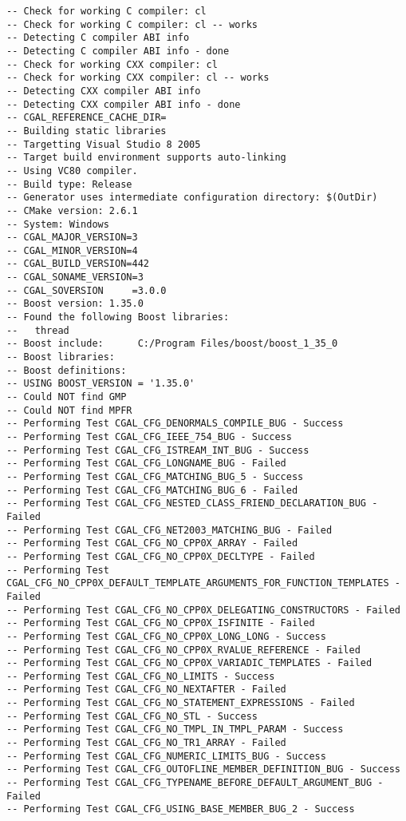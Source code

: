 {\ccTexHtml{\scriptsize}{}
\begin{verbatim}
-- Check for working C compiler: cl
-- Check for working C compiler: cl -- works
-- Detecting C compiler ABI info
-- Detecting C compiler ABI info - done
-- Check for working CXX compiler: cl
-- Check for working CXX compiler: cl -- works
-- Detecting CXX compiler ABI info
-- Detecting CXX compiler ABI info - done
-- CGAL_REFERENCE_CACHE_DIR=
-- Building static libraries
-- Targetting Visual Studio 8 2005
-- Target build environment supports auto-linking
-- Using VC80 compiler.
-- Build type: Release
-- Generator uses intermediate configuration directory: $(OutDir)
-- CMake version: 2.6.1
-- System: Windows
-- CGAL_MAJOR_VERSION=3
-- CGAL_MINOR_VERSION=4
-- CGAL_BUILD_VERSION=442
-- CGAL_SONAME_VERSION=3
-- CGAL_SOVERSION     =3.0.0
-- Boost version: 1.35.0
-- Found the following Boost libraries:
--   thread
-- Boost include:      C:/Program Files/boost/boost_1_35_0
-- Boost libraries:    
-- Boost definitions:  
-- USING BOOST_VERSION = '1.35.0'
-- Could NOT find GMP
-- Could NOT find MPFR
-- Performing Test CGAL_CFG_DENORMALS_COMPILE_BUG - Success
-- Performing Test CGAL_CFG_IEEE_754_BUG - Success
-- Performing Test CGAL_CFG_ISTREAM_INT_BUG - Success
-- Performing Test CGAL_CFG_LONGNAME_BUG - Failed
-- Performing Test CGAL_CFG_MATCHING_BUG_5 - Success
-- Performing Test CGAL_CFG_MATCHING_BUG_6 - Failed
-- Performing Test CGAL_CFG_NESTED_CLASS_FRIEND_DECLARATION_BUG - Failed
-- Performing Test CGAL_CFG_NET2003_MATCHING_BUG - Failed
-- Performing Test CGAL_CFG_NO_CPP0X_ARRAY - Failed
-- Performing Test CGAL_CFG_NO_CPP0X_DECLTYPE - Failed
-- Performing Test CGAL_CFG_NO_CPP0X_DEFAULT_TEMPLATE_ARGUMENTS_FOR_FUNCTION_TEMPLATES - Failed
-- Performing Test CGAL_CFG_NO_CPP0X_DELEGATING_CONSTRUCTORS - Failed
-- Performing Test CGAL_CFG_NO_CPP0X_ISFINITE - Failed
-- Performing Test CGAL_CFG_NO_CPP0X_LONG_LONG - Success
-- Performing Test CGAL_CFG_NO_CPP0X_RVALUE_REFERENCE - Failed
-- Performing Test CGAL_CFG_NO_CPP0X_VARIADIC_TEMPLATES - Failed
-- Performing Test CGAL_CFG_NO_LIMITS - Success
-- Performing Test CGAL_CFG_NO_NEXTAFTER - Failed
-- Performing Test CGAL_CFG_NO_STATEMENT_EXPRESSIONS - Failed
-- Performing Test CGAL_CFG_NO_STL - Success
-- Performing Test CGAL_CFG_NO_TMPL_IN_TMPL_PARAM - Success
-- Performing Test CGAL_CFG_NO_TR1_ARRAY - Failed
-- Performing Test CGAL_CFG_NUMERIC_LIMITS_BUG - Success
-- Performing Test CGAL_CFG_OUTOFLINE_MEMBER_DEFINITION_BUG - Success
-- Performing Test CGAL_CFG_TYPENAME_BEFORE_DEFAULT_ARGUMENT_BUG - Failed
-- Performing Test CGAL_CFG_USING_BASE_MEMBER_BUG_2 - Success

\end{verbatim}}
